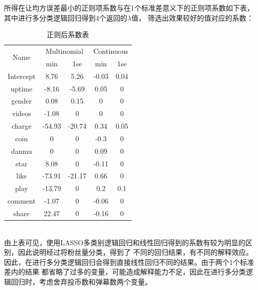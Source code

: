 \documentclass{ctexart}
\begin{document}
\indent 所得在让均方误差最小的正则项系数与在1个标准差意义下的正则项系数如下表，其中进行多分类逻辑回归得到4个返回的$\lambda$值，
筛选出效果较好的值对应的系数：
\begin{table}[htbp]
    \centering
    \begin{tabular}{ccccc}
    \hline
    \multirow{2}{*}{Name} & \multicolumn{2}{c}{Multinomial} & \multicolumn{2}{c}{Continuous} \\ \cline{2-5} 
                          & min            & 1se            & min            & 1se           \\ \hline
    Intercept             & 8.76           & 5.26           & -0.03          & 0.04          \\
    uptime                & -8.16          & -5.69          & 0.05           & 0             \\
    gender                & 0.08           & 0.15           & 0              & 0             \\
    videos                & -1.08          & 0              & 0              & 0             \\
    charge                & -54.93         & -20.74         & 0.34           & 0.05          \\
    coin                  & 0              & 0              & -0.3           & 0             \\
    danmu                 & 0              & 0              & 0.09           & 0             \\
    star                  & 8.08           & 0              & -0.11          & 0             \\
    like                  & -73.91         & -21.17         & 0.66           & 0             \\
    play                  & -13.79         & 0              & 0.2            & 0.1           \\
    comment               & -1.07          & 0              & -0.06          & 0             \\
    share                 & 22.47          & 0              & -0.16          & 0             \\ \hline
    \end{tabular}
    \caption{正则后系数表}
\end{table}\\
\indent 由上表可见，使用LASSO多类别逻辑回归和线性回归得到的系数有较为明显的区别，因此说明经过将粉丝量分类，得到了
不同的回归结果，有不同的解释效应。因此，在进行多分类逻辑回归会得到直接线性回归不同的结果。由于两个1个标准差内的结果
都省略了过多的变量，可能造成解释能力不足，因此在进行多分类逻辑回归时，考虑舍弃投币数和弹幕数两个变量。
\end{document}
